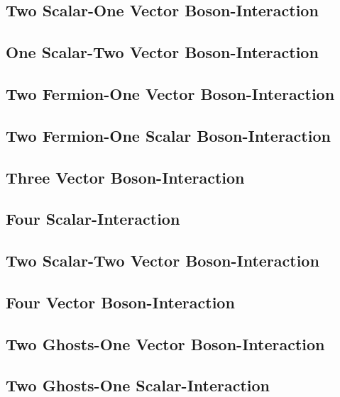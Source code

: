\documentclass[A4]{article}
\begin{document}
\subsection{Two Scalar-One Vector Boson-Interaction}

\subsection{One Scalar-Two Vector Boson-Interaction}

\subsection{Two Fermion-One Vector Boson-Interaction}

\subsection{Two Fermion-One Scalar Boson-Interaction}

\subsection{Three Vector Boson-Interaction}

\subsection{Four Scalar-Interaction}

\subsection{Two Scalar-Two Vector Boson-Interaction}

\subsection{Four Vector Boson-Interaction}

\subsection{Two Ghosts-One Vector Boson-Interaction}

\subsection{Two Ghosts-One Scalar-Interaction}


\end{document}
